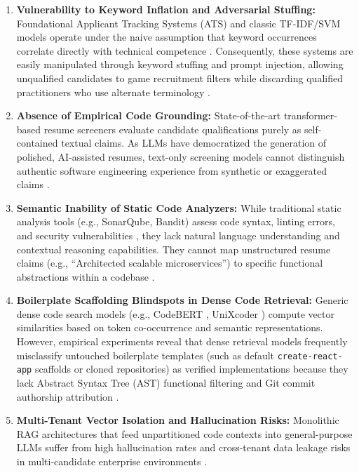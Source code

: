 \begin{enumerate}[leftmargin=*, label=\arabic*.]
    \item \textbf{Vulnerability to Keyword Inflation and Adversarial Stuffing:} Foundational Applicant Tracking Systems (ATS) and classic TF-IDF/SVM models operate under the naive assumption that keyword occurrences correlate directly with technical competence \cite{ref1, ref7, ref11}. Consequently, these systems are easily manipulated through keyword stuffing and prompt injection, allowing unqualified candidates to game recruitment filters while discarding qualified practitioners who use alternate terminology \cite{ref10, ref19}.
    
    \item \textbf{Absence of Empirical Code Grounding:} State-of-the-art transformer-based resume screeners \cite{ref12, ref23} evaluate candidate qualifications purely as self-contained textual claims. As LLMs have democratized the generation of polished, AI-assisted resumes, text-only screening models cannot distinguish authentic software engineering experience from synthetic or exaggerated claims \cite{ref4, ref8, ref17}.
    
    \item \textbf{Semantic Inability of Static Code Analyzers:} While traditional static analysis tools (e.g., SonarQube, Bandit) assess code syntax, linting errors, and security vulnerabilities \cite{ref24, ref36}, they lack natural language understanding and contextual reasoning capabilities. They cannot map unstructured resume claims (e.g., ``Architected scalable microservices'') to specific functional abstractions within a codebase \cite{ref15, ref20}.
    
    \item \textbf{Boilerplate Scaffolding Blindspots in Dense Code Retrieval:} Generic dense code search models (e.g., CodeBERT \cite{ref37}, UniXcoder \cite{ref50}) compute vector similarities based on token co-occurrence and semantic representations. However, empirical experiments reveal that dense retrieval models frequently misclassify untouched boilerplate templates (such as default \texttt{create-react-app} scaffolds or cloned repositories) as verified implementations because they lack Abstract Syntax Tree (AST) functional filtering and Git commit authorship attribution \cite{ref25, ref26, ref58}.
    
    \item \textbf{Multi-Tenant Vector Isolation and Hallucination Risks:} Monolithic RAG architectures that feed unpartitioned code contexts into general-purpose LLMs suffer from high hallucination rates and cross-tenant data leakage risks in multi-candidate enterprise environments \cite{ref31, ref33, ref34}.
\end{enumerate}

